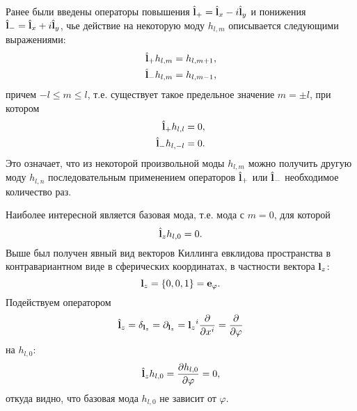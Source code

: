 \documentclass[12pt,a4paper]{article}
\begin{document}
            Ранее были введены операторы повышения $\hat{\mathbf{l}}_{+} = \hat{\mathbf{l}}_x - i \hat{\mathbf{l}}_y$ и понижения $\hat{\mathbf{l}}_{-} = \hat{\mathbf{l}}_x + i \hat{\mathbf{l}}_y$, чье действие на некоторую моду $h_{l, m}$ описывается следующими выражениями:
            \begin{equation}\begin{aligned}
                \hat{\mathbf{l}}_{+} h_{l, m} &= h_{l, m+1} , \\
                \hat{\mathbf{l}}_{-} h_{l, m} &= h_{l, m-1} ,
            \end{aligned}\end{equation}
            причем $- l \le m \le l$, т.е. существует такое предельное значение $m = \pm l$, при котором
            \begin{equation}\begin{aligned}
                \hat{\mathbf{l}}_{+} h_{l, l}   &= 0 , \\
                \hat{\mathbf{l}}_{-} h_{l, - l} &= 0 .
            \end{aligned}\end{equation}
            Это означает, что из некоторой произвольной моды $h_{l, m}$ можно получить другую моду $h_{l, n}$ последовательным применением операторов $\hat{\mathbf{l}}_{+}$ или $\hat{\mathbf{l}}_{-}$ необходимое количество раз.

            Наиболее интересной является базовая мода, т.е. мода с $m = 0$, для которой
            \begin{equation}
                \hat{\mathbf{l}}_z h_{l, 0} = 0 .
            \end{equation}
            Выше был получен явный вид векторов Киллинга евклидова пространства в контравариантном виде в сферических координатах, в частности вектора $\mathbf{l}_z$:
            \begin{equation}
                \mathbf{l}_z = \qty{ 0, 0, 1 } = \mathbf{e}_\varphi .
            \end{equation}
            Подействуем оператором\footnotemark
            \begin{equation}
                \hat{\mathbf{l}}_z
                    = \delta_{\mathbf{l}_z}
                    = \partial_{\mathbf{l}_z}
                    = {\mathbf{l}_z}^i \pdv{x^i}
                    = \pdv{\varphi}
            \end{equation}
            на $h_{l, 0}$:
            \begin{equation}
                \hat{\mathbf{l}}_z h_{l, 0} = \pdv{h_{l, 0}}{\varphi} = 0 ,
            \end{equation}
            откуда видно, что базовая мода $h_{l, 0}$ не зависит от $\varphi$.
\end{document}
